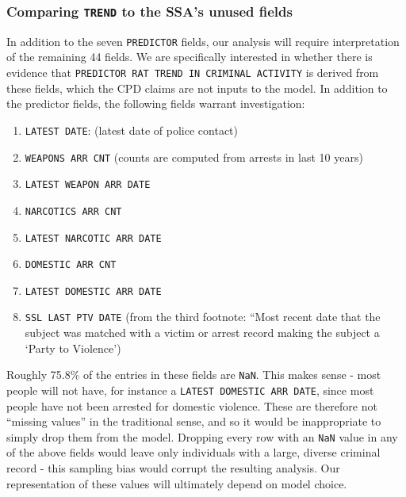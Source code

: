 \subsubsection{Comparing \texttt{TREND} to the SSA's unused fields}
In addition to the seven \texttt{PREDICTOR} fields, our analysis will require interpretation of the remaining 44 fields. We are specifically interested in whether there is evidence that \texttt{PREDICTOR RAT TREND IN CRIMINAL ACTIVITY} is derived from these fields, which the CPD claims are not inputs to the model. In addition to the predictor fields, the following fields warrant investigation:\\
\begin{enumerate}[nolistsep]
    \item \texttt{LATEST DATE}: (latest date of police contact)
    \item \texttt{WEAPONS ARR CNT} (counts are computed from arrests in last 10 years)
    \item \texttt{LATEST WEAPON ARR DATE}
    \item \texttt{NARCOTICS ARR CNT}
    \item \texttt{LATEST NARCOTIC ARR DATE}
    \item \texttt{DOMESTIC ARR CNT}
    \item \texttt{LATEST DOMESTIC ARR DATE}
    \item \texttt{SSL LAST PTV DATE} (from the third footnote: “Most recent date that the subject was matched with a victim or arrest record making the subject a ‘Party to Violence’)\\
\end{enumerate}
Roughly 75.8\% of the entries in these fields are \texttt{NaN}. This makes sense - most people will not have, for instance a \texttt{LATEST DOMESTIC ARR DATE}, since most people have not been arrested for domestic violence. These are therefore not “missing values” in the traditional sense, and so it would be inappropriate to simply drop them from the model. Dropping every row with an \texttt{NaN} value in any of the above fields would leave only individuals with a large, diverse criminal record - this sampling bias would corrupt the resulting analysis. Our representation of these values will ultimately depend on model choice.

